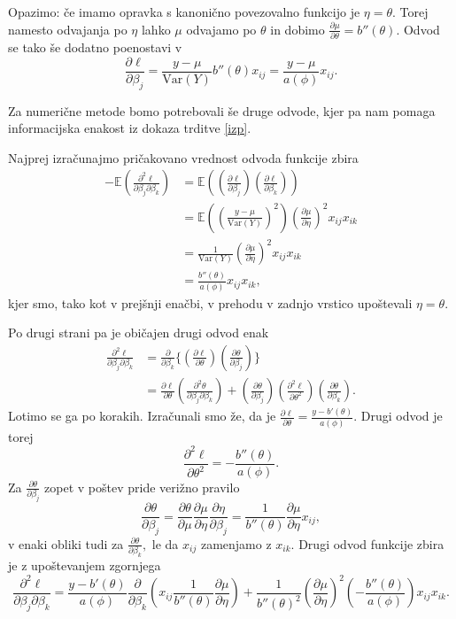 \documentclass[12pt,a4paper]{amsart}
\theoremstyle{definition} %
\theoremstyle{plain} %
\begin{document}
Opazimo: če imamo opravka s kanonično povezovalno funkcijo je $\eta = \theta.$ Torej namesto odvajanja po $\eta$ lahko $\mu$ odvajamo po $\theta$ in
dobimo $\frac{\partial\mu}{\partial\theta} = b''(\theta)$. Odvod se tako še dodatno poenostavi v
\begin{equation}
    \frac{\partial \ell}{\partial\beta_{j}} = \frac{y-\mu}{\mathrm{Var}(Y)}b''(\theta)x_{ij} = \frac{y-\mu}{a(\phi)}x_{ij}.
\end{equation}

Za numerične metode bomo potrebovali še druge odvode, kjer pa nam pomaga informacijska enakost iz dokaza trditve \ref{izp}.

Najprej izračunajmo pričakovano vrednost odvoda funkcije zbira
\begin{align*}
    -\mathbb{E}\left(\frac{\partial^2 \ell}{\partial\beta_{j}\partial\beta_{k}}\right) &= \mathbb{E}\left((\frac{\partial \ell}{\partial \beta_{j}})(\frac{\partial \ell}{\partial \beta_{k}})\right) \\
    &= \mathbb{E}\left(\left(\frac{y-\mu}{\mathrm{Var}(Y)}\right)^{2}\right)(\frac{\partial\mu}{\partial\eta})^{2}x_{ij}x_{ik} \\
    &= \frac{1}{\mathrm{Var}(Y)}(\frac{\partial\mu}{\partial\eta})^{2}x_{ij}x_{ik} \\
    &= \frac{b''(\theta)}{a(\phi)}x_{ij}x_{ik},
\end{align*}
kjer smo, tako kot v prejšnji enačbi, v prehodu v zadnjo vrstico upoštevali $\eta = \theta.$ 

Po drugi strani pa je običajen drugi odvod enak
\begin{align}\label{drugiOdvodZbira}
    \frac{\partial^2\ell}{\partial\beta_{j}\partial\beta_{k}} &= \frac{\partial}{\partial\beta_{k}}\{\left(\frac{\partial \ell}{\partial\theta}\right)\left(\frac{\partial \theta}{\partial\beta_{j}}\right)\} \nonumber \\
    &= \frac{\partial \ell}{\partial\theta}\left(\frac{\partial^2\theta}{\partial\beta_{j}\partial\beta_{k}}\right) + \left(\frac{\partial\theta}{\partial\beta_{j}}\right)\left(\frac{\partial^2\ell}{\partial\theta^2}\right)\left(\frac{\partial\theta}{\partial\beta_{k}}\right).
\end{align}
Lotimo se ga po korakih. Izračunali smo že, da je $\frac{\partial \ell}{\partial\theta} = \frac{y-b'(\theta)}{a(\phi)}.$ Drugi odvod je torej
\[
    \frac{\partial^2 \ell}{\partial\theta^2} = -\frac{b''(\theta)}{a(\phi)}.
\]
Za $\frac{\partial\theta}{\partial\beta_{j}}$ zopet v poštev pride verižno pravilo
\[
    \frac{\partial\theta}{\partial\beta_{j}} = \frac{\partial\theta}{\partial\mu}\frac{\partial\mu}{\partial\eta}\frac{\partial\eta}{\partial\beta_{j}} = \frac{1}{b''(\theta)}\frac{\partial\mu}{\partial\eta}x_{ij},
\]
v enaki obliki tudi za $\frac{\partial\theta}{\partial\beta_{k}},$ le da $x_{ij}$ zamenjamo z $x_{ik}.$
Drugi odvod funkcije zbira je z upoštevanjem zgornjega
\[
    \frac{\partial^2\ell}{\partial\beta_{j}\partial\beta_{k}} = \frac{y-b'(\theta)}{a(\phi)}\frac{\partial}{\partial\beta_{k}}\left(x_{ij}\frac{1}{b''(\theta)}\frac{\partial\mu}{\partial\eta}\right) + 
    \frac{1}{b''(\theta)^2}\left(\frac{\partial\mu}{\partial\eta}\right)^2\left(-\frac{b''(\theta)}{a(\phi)}\right)x_{ij}x_{ik}.
\]
\end{document}
